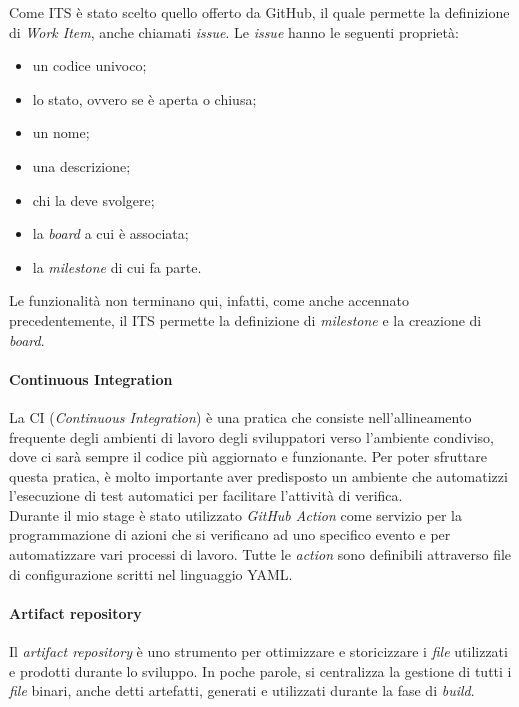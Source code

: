 Come ITS è stato scelto quello offerto da GitHub, il quale permette la definizione di \textit{Work Item}, anche chiamati \textit{issue}. Le \textit{issue} hanno le seguenti proprietà:
\begin{itemize}
  \item un codice univoco;
  \item lo stato, ovvero se è aperta o chiusa;
  \item un nome;
  \item una descrizione;
  \item chi la deve svolgere;
  \item la \textit{board} a cui è associata;
  \item la \textit{milestone} di cui fa parte.
\end{itemize}

Le funzionalità non terminano qui, infatti, come anche accennato precedentemente, il ITS permette la definizione di \textit{milestone} e la creazione di \textit{board}.

\paragraph{Continuous Integration}
La CI (\textit{Continuous Integration}) è una pratica che consiste nell'allineamento frequente degli ambienti di lavoro degli sviluppatori verso l'ambiente condiviso, dove ci sarà sempre il codice più aggiornato e funzionante. Per poter sfruttare questa pratica, è molto importante aver predisposto un ambiente che automatizzi l'esecuzione di test automatici per facilitare l'attività di verifica. \\

Durante il mio stage è stato utilizzato \textit{GitHub Action} come servizio per la programmazione di azioni che si verificano ad uno specifico evento e per automatizzare vari processi di lavoro. Tutte le \textit{action} sono definibili attraverso file di configurazione scritti nel linguaggio YAML.

\paragraph{Artifact repository}
Il \textit{artifact repository} è uno strumento per ottimizzare e storicizzare i \textit{file} utilizzati e prodotti durante lo sviluppo. In poche parole, si centralizza la gestione di tutti i \textit{file} binari, anche detti artefatti, generati e utilizzati durante la fase di \textit{build}. \\

